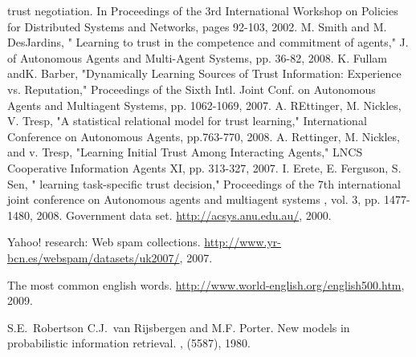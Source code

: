 \documentclass{llncs}
\begin{document}
\begin{thebibliography}{99.}
trust negotiation. In Proceedings of the 3rd International
Workshop on Policies for Distributed Systems and
Networks, pages 92-103, 2002.
 M. Smith and M. DesJardins, " Learning to trust in the competence and commitment of agents," J. of 	Autonomous Agents and Multi-Agent Systems, pp. 36-82, 2008. 
 K. Fullam andK. Barber, "Dynamically Learning Sources of Trust Information: Experience vs. Reputation," Proceedings of the Sixth Intl. Joint Conf. on Autonomous Agents and Multiagent Systems, pp. 1062-1069, 2007.
 A. REttinger, M. Nickles, V. Tresp, "A statistical relational model for trust learning," International Conference on Autonomous Agents,  pp.763-770, 2008. 
 A. Rettinger, M. Nickles, and v. Tresp,  "Learning Initial Trust Among Interacting Agents," LNCS Cooperative Information Agents XI, pp. 313-327, 2007.
 I. Erete, E. Ferguson, S. Sen, " learning task-specific trust decision," Proceedings of the 7th international joint conference on Autonomous agents and multiagent systems , vol. 3,  pp. 1477-1480, 2008.
Government data set.
\newblock \url{http://acsys.anu.edu.au/}, 2000.

Yahoo! research: Web spam collections.
\newblock \url{http://www.yr-bcn.es/webspam/datasets/uk2007/}, 2007.

The most common english words.
\newblock \url{http://www.world-english.org/english500.htm}, 2009.

S.E.~Robertson C.J.~van Rijsbergen and M.F. Porter.
\newblock New models in probabilistic information retrieval.
, (5587), 1980.


\end{thebibliography}
\end{document}
